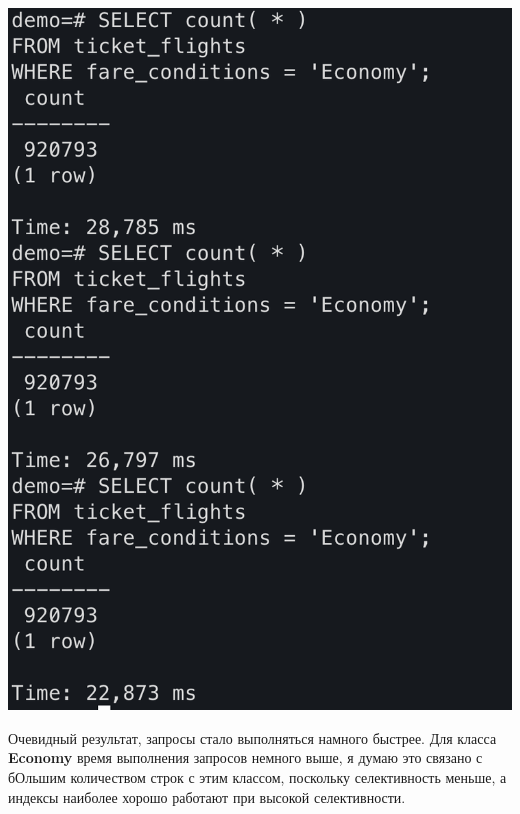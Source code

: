 \documentclass[a4paper,12pt]{article}
\begin{document}
\begin{itemize}
\begin{center}
\includegraphics[scale=0.4]{26.png}
\end{center}
\end{itemize}
Очевидный результат, запросы стало выполняться намного быстрее. Для класса \textbf{Economy} время выполнения запросов немного выше, я думаю это связано с бОльшим количеством строк с этим классом, поскольку селективность меньше, а индексы наиболее хорошо работают при высокой селективности.
\end{document}

